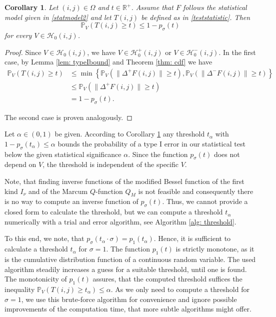 \documentclass[a4paper,12pt]{article}
\newcommand{\norm}[1]{\lVert#1\rVert}
\theoremstyle{plain}
\newtheorem{corollary}[theorem]{Corollary}
\theoremstyle{definition}
\numberwithin{equation}{section}
\begin{document}
\begin{corollary}\label{cor: typeIbound}
	Let $(i, j) \in \Omega$ and $t \in \mathbb{R}^+$. Assume that $F$ follows the statistical model given in \eqref{statmodel2} and let $T(i, j)$ be defined as in \eqref{teststatistic}. Then
	\begin{equation}\label{ineq: typeIbound}
		\mathbb{P}_V\left( T(i, j) \geq t \right) \leq 1 - p_\sigma(t)
	\end{equation}
	for every $V \in \mathcal{H}_0(i, j)$.
\end{corollary}
\begin{proof}
	Since $V \in \mathcal{H}_0(i, j)$, we have $V \in \mathcal{H}_0^+(i, j)$ or $V \in \mathcal{H}_0^-(i, j)$. In the first case, by Lemma \ref{lem: typeIbound} and Theorem \ref{thm: cdf} we have
	\begin{align*}
		\mathbb{P}_V\left( T(i, j) \geq t \right) &\leq \min \left\{ \mathbb{P}_V\left( \norm{\Delta^+ F(i, j)} \geq t \right), \mathbb{P}_V\left( \norm{\Delta^- F(i, j)} \geq t \right) \right\} \\
		&\leq \mathbb{P}_V\left( \norm{\Delta^+ F(i, j)} \geq t \right) \\
		&= 1 - p_\sigma(t).
	\end{align*}
	
	The second case is proven analogously.
\end{proof}

Let $\alpha \in (0, 1)$ be given. According to Corollary \ref{cor: typeIbound} any threshold $t_\alpha$ with $1 - p_\sigma(t_\alpha) \leq \alpha$ bounds the probability of a type I error in our statistical test below the given statistical significance $\alpha$. Since the function $p_\sigma(t)$ does not depend on $V$, the threshold is independent of the specific $V$.

Note, that finding inverse functions of the modified Bessel function of the first kind $I_\nu$ and of the Marcum $Q$-function $Q_M$ is not feasible and consequently there is no way to compute an inverse function of $p_\sigma(t)$. Thus, we cannot provide a closed form to calculate the threshold, but we can compute a threshold $t_\alpha$ numerically with a trial and error algorithm, see Algorithm \ref{alg: threshold}.

To this end, we note, that $p_\sigma(t_\alpha \cdot \sigma) = p_1(t_\alpha)$. Hence, it is sufficient to calculate a threshold $t_\alpha$ for $\sigma = 1$. The function $p_1(t)$ is strictly monotone, as it is the cumulative distribution function of a continuous random variable. The used algorithm steadily increases a guess for a suitable threshold, until one is found. The monotonicity of $p_1(t)$ assures, that the computed threshold suffices the inequality $\mathbb{P}_V\left( T(i, j) \geq t_\alpha \right) \leq \alpha$. As we only need to compute a threshold for $\sigma = 1$, we use this brute-force algorithm for convenience and ignore possible improvements of the computation time, that more subtle algorithms might offer.
\end{document}
